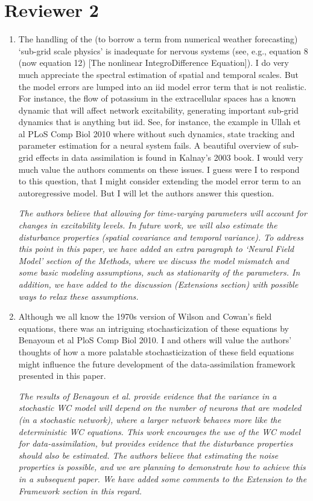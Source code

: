 \documentclass{article}
\begin{document}
    \section{Reviewer 2}
    
\begin{enumerate}
    \item The handling of the (to borrow a term from numerical weather forecasting) `sub-grid scale physics' is inadequate for nervous systems (see, e.g., equation 8 (now equation 12) [The nonlinear IntegroDifference Equation]). I do very much appreciate the spectral estimation of spatial and temporal scales. But the model errors are lumped into an iid model error term that is not realistic. For instance, the flow of potassium in the extracellular spaces has a known dynamic that will affect network excitability, generating important sub-grid dynamics that is anything but iid. See, for instance, the example in Ullah et al PLoS Comp Biol 2010 where without such dynamics, state tracking and parameter estimation for a neural system fails. A beautiful overview of sub-grid effects in data assimilation is found in Kalnay's 2003 book. I would very much value the authors comments on these issues. I guess were I to respond to this question, that I might consider extending the model error term to an autoregressive model. But I will let the authors answer this question.

	\emph{The authors believe that allowing for time-varying parameters will account for changes in excitability levels. In future work, we will also estimate the disturbance properties (spatial covariance and temporal variance). To address this point in this paper, we have added an extra paragraph to `Neural Field Model' section of the Methods, where we discuss the model mismatch and some basic modeling assumptions, such as stationarity of the parameters. In addition, we have added to the discussion (Extensions section) with possible ways to relax these assumptions.}
	

\item Although we all know the 1970s version of Wilson and Cowan's field equations, there was an intriguing stochasticization of these equations by Benayoun et al PloS Comp Biol 2010. I and others will value the authors' thoughts of how a more palatable stochasticization of these field equations might influence the future development of the data-assimilation framework presented in this paper.

\emph{The results of Benayoun et al. provide evidence that the variance in a stochastic WC model will depend on the number of neurons that are modeled (in a stochastic network), where a larger network behaves more like the deterministic WC equations. This work encourages the use of the WC model for data-assimilation, but provides evidence that the disturbance properties should also be estimated. The authors believe that estimating the noise properties is possible, and we are planning to demonstrate how to achieve this in a subsequent paper. We have added some comments to the Extension to the Framework section in this regard.}


\end{enumerate}
\end{document}
